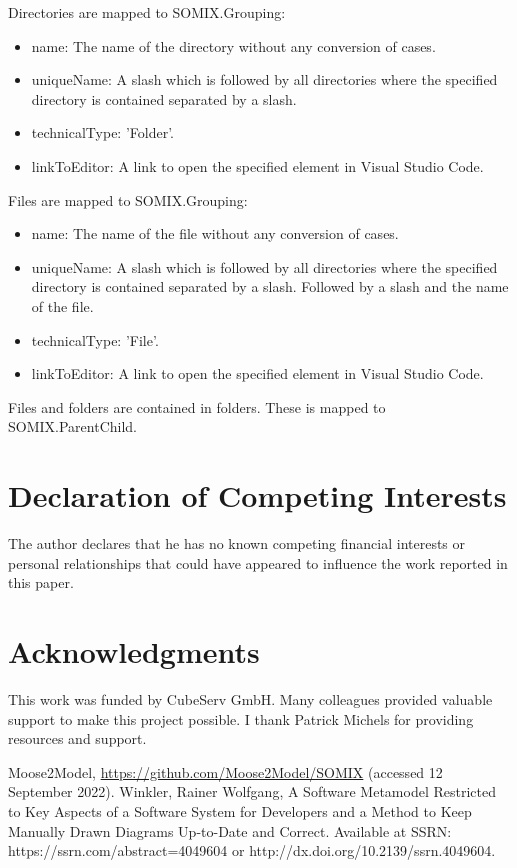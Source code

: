 \documentclass[preprint,12pt]{elsarticle}
\begin{document}
Directories are mapped to SOMIX.Grouping:
\begin{itemize}
\item name: The name of the directory without any conversion of cases.
\item uniqueName: A slash which is followed by all directories where the specified directory is contained separated by a slash.
\item technicalType: 'Folder'.
\item linkToEditor: A link to open the specified element in Visual Studio Code.
\end{itemize}

Files are mapped to SOMIX.Grouping:
\begin{itemize}
\item name: The name of the file without any conversion of cases.
\item uniqueName: A slash which is followed by all  directories where the specified directory is contained separated by a slash. Followed by a slash and the name of the file.
\item technicalType: 'File'.
\item linkToEditor: A link to open the specified element in Visual Studio Code.
\end{itemize}

Files and folders are contained in folders. These is mapped to SOMIX.ParentChild.



\section*{Declaration of Competing Interests} 
The author declares that he has no known competing financial interests or personal relationships that could have appeared to influence the work reported in this paper.



\section*{Acknowledgments}

This work was funded by CubeServ GmbH.
Many colleagues provided valuable support to make this project possible.
I thank
Patrick Michels for providing resources and support.



\begin{thebibliography}{00}

Moose2Model, \url{https://github.com/Moose2Model/SOMIX} (accessed 12 September 2022).
Winkler, Rainer Wolfgang, A Software Metamodel Restricted to Key Aspects of a Software System for Developers and a Method to Keep Manually Drawn Diagrams Up-to-Date and Correct. Available at SSRN: https://ssrn.com/abstract=4049604 or http://dx.doi.org/10.2139/ssrn.4049604.


\end{thebibliography}
\end{document}
